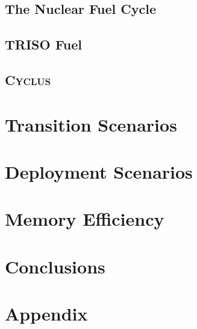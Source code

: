 \documentclass[edeposit,fullpage]{uiucthesis2018}
\newcommand{\cyclus}{\textsc{Cyclus}\xspace}
\begin{document}
\section{The Nuclear Fuel Cycle}




\section{TRISO Fuel}




\section{\cyclus}


\chapter{Transition Scenarios}
\label{ch:ts}

\chapter{Deployment Scenarios}
\label{ch:scenarios}



\chapter{Memory Efficiency}
\label{ch:memory}

\chapter{Conclusions}
\label{ch:conclusions}









\chapter{Appendix}


\backmatter



\end{document}
